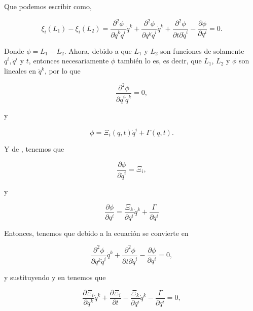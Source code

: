 \documentclass[a4paper,10pt]{article}
\numberwithin{equation}{section}
\begin{document}
Que podemos escribir como,

\begin{equation}
 \xi_i (L_1) - \xi_i (L_2) = \frac{\partial^2 \phi}{\partial \dot{q}^k\dot{q}^i} \ddot{q}^k
 + \frac{\partial^2 \phi}{\partial q^k \dot{q}^i} \dot{q}^k + \frac{\partial^2 \phi}{\partial t \partial \dot{q}^i}  
 - \frac{\partial \phi}{\partial q^i} = 0.
 \label{eq:4cero}
 \end{equation}

Donde $\phi = L_1 - L_2$. Ahora, debido a que $L_1$ y $L_2$ son funciones de solamente 
$q^i,\dot{q}^i$ y $t$, entonces necesariamente $\phi$ también lo es, es decir, que 
$L_1$, $L_2$ y $\phi$ son lineales en $\ddot{q}^k$, por lo que

\begin{equation}
 \frac{\partial^2 \phi}{\partial \dot{q}^i\dot{q}^k} = 0,
 \label{eq:4phi0}
\end{equation}

y 

\begin{equation}
 \phi = \Xi_i (q,t) \dot{q}^i + \Gamma(q,t).
 \label{eq:4phi1}
\end{equation}

Y de , tenemos que 

\begin{equation}
 \frac{\partial \phi}{\partial \dot{q}^i} = \Xi_i,
 \label{eq:4xi1}
\end{equation}

y

\begin{equation}
 \frac{\partial \phi}{\partial q^i} = \frac{\Xi_k}{\partial q^i}\dot{q}^k + \frac{\Gamma}{\partial q^i}
\label{eq:4phipartial}
 \end{equation}


Entonces, tenemos que debido a  la ecuación  se convierte en

\begin{equation}
 \frac{\partial^2 \phi}{\partial q^k \dot{q}^i} \dot{q}^k + \frac{\partial^2 \phi}{\partial t \partial \dot{q}^i}  
 - \frac{\partial \phi}{\partial q^i} = 0,
 \label{eq:4cero1}
\end{equation}

y sustituyendo  y  en  tenemos que

\begin{equation}
 \frac{\partial \Xi_i}{\partial q^k} \dot{q}^k + \frac{\partial \Xi_i}{\partial t}
- \frac{\Xi_k}{\partial q^i}\dot{q}^k - \frac{\Gamma}{\partial q^i} = 0,
\end{equation}
\end{document}
